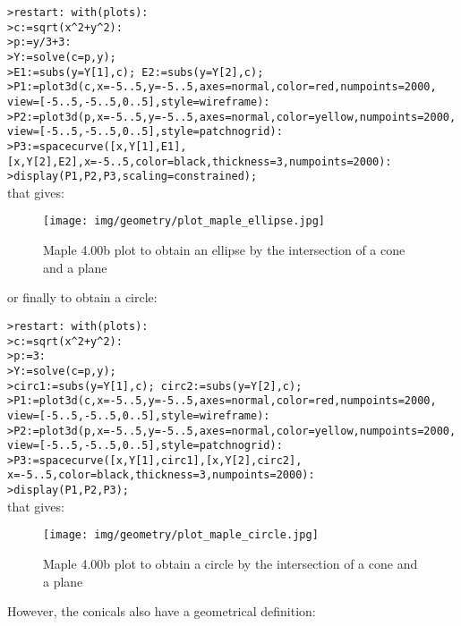 \begin{enumerate}
		\texttt{>restart: with(plots):}\\
		\texttt{>c:=sqrt(x\string^2+y\string^2):}\\
		\texttt{>p:=y/3+3:}\\
		\texttt{>Y:=solve(c=p,y); }\\
		\texttt{>E1:=subs(y=Y[1],c); E2:=subs(y=Y[2],c);}\\
		\texttt{>P1:=plot3d(c,x=-5..5,y=-5..5,axes=normal,color=red,numpoints=2000,}\\
		\texttt{view=[-5..5,-5..5,0..5],style=wireframe):}\\
		\texttt{>P2:=plot3d(p,x=-5..5,y=-5..5,axes=normal,color=yellow,numpoints=2000,}\\
		\texttt{view=[-5..5,-5..5,0..5],style=patchnogrid):}\\
		\texttt{>P3:=spacecurve({[x,Y[1],E1],[x,Y[2],E2]},x=-5..5,color=black,thickness=3,numpoints=2000):}\\
		\texttt{>display(P1,P2,P3,scaling=constrained);}\\
		
		that gives:
		\begin{figure}[H]
			\centering
			\texttt{[image: img/geometry/plot\_maple\_ellipse.jpg]}
			\caption{Maple 4.00b plot to obtain an ellipse by the intersection of a cone and a plane}
		\end{figure}
		or finally to obtain a circle:
		
		\texttt{>restart: with(plots):}\\
		\texttt{>c:=sqrt(x\string^2+y\string^2):}\\
		\texttt{>p:=3:}\\
		\texttt{>Y:=solve(c=p,y);}\\
		\texttt{>circ1:=subs(y=Y[1],c); circ2:=subs(y=Y[2],c);}\\
		\texttt{>P1:=plot3d(c,x=-5..5,y=-5..5,axes=normal,color=red,numpoints=2000,}\\
		\texttt{view=[-5..5,-5..5,0..5],style=wireframe):}\\
		\texttt{>P2:=plot3d(p,x=-5..5,y=-5..5,axes=normal,color=yellow,numpoints=2000,}\\
		\texttt{view=[-5..5,-5..5,0..5],style=patchnogrid):}\\
		\texttt{>P3:=spacecurve({[x,Y[1],circ1],[x,Y[2],circ2]},
x=-5..5,color=black,thickness=3,numpoints=2000):}\\
		\texttt{>display(P1,P2,P3);}\\

		that gives:
		\begin{figure}[H]
			\centering
			\texttt{[image: img/geometry/plot\_maple\_circle.jpg]}
			\caption{Maple 4.00b plot to obtain a circle by the intersection of a cone and a plane}
		\end{figure}		
	\end{enumerate}
	However, the conicals also have a geometrical definition:
	
